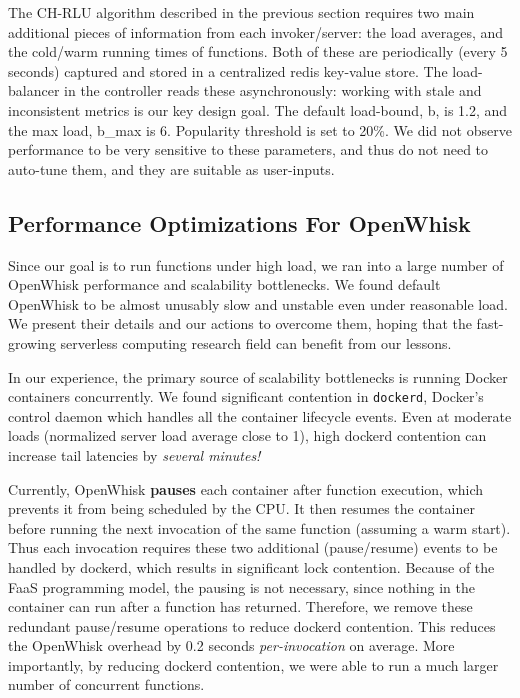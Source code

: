 The CH-RLU algorithm described in the previous section requires two main additional pieces of information from each invoker/server: the load averages, and the cold/warm running times of functions. 
Both of these are periodically (every 5 seconds) captured and stored in a centralized redis key-value store.
The load-balancer in the controller reads these asynchronously: working with stale and inconsistent metrics is our key design goal. 
The default load-bound, b, is 1.2, and the max load, b\_max is 6. Popularity threshold is set to 20\%.
We did not observe performance to be very sensitive to these parameters, and thus do not need to auto-tune them, and they are suitable as user-inputs. 

\subsection{Performance Optimizations For OpenWhisk}

Since our goal is to run functions under high load, we ran into a large number of OpenWhisk performance and scalability bottlenecks.
We found default OpenWhisk to be almost unusably slow and unstable even under reasonable load. 
We present their details and our actions to overcome them, hoping that the fast-growing serverless computing research field can benefit from our lessons. 


In our experience, the primary source of scalability bottlenecks is running Docker containers concurrently.
We found significant contention in \texttt{dockerd}, Docker's control daemon which handles all the container lifecycle events.
Even at moderate loads (normalized server load average close to 1), high dockerd contention can increase tail latencies by \emph{several minutes!}


Currently, OpenWhisk \textbf{pauses} each container after function execution, which prevents it from being scheduled by the CPU.
It then resumes the container before running the next invocation of the same function (assuming a warm start).
Thus each invocation requires these two additional (pause/resume) events to be handled by dockerd, which results in significant lock contention.
Because of the FaaS programming model, the pausing is not necessary, since nothing in the container can run after a function has returned.
Therefore, we remove these redundant pause/resume operations to reduce dockerd contention.
This reduces the OpenWhisk overhead by 0.2 seconds \emph{per-invocation} on average.
More importantly, by reducing dockerd contention, we were able to run a much larger number of concurrent functions. 

